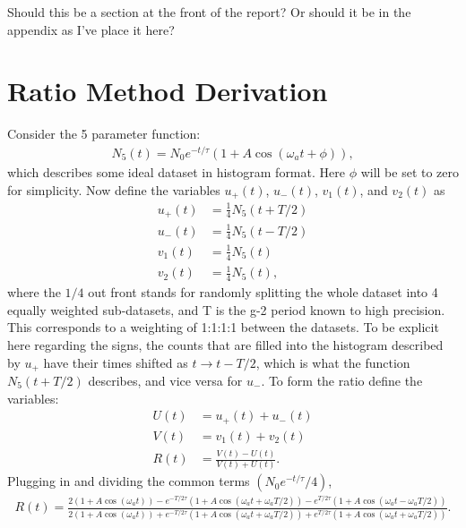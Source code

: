 Should this be a section at the front of the report? Or should it be in the appendix as I've place it here?

\chapter{Ratio Method Derivation}

Consider the 5 parameter function:
	\begin{align}
		N_{5}(t) = N_{0}e^{-t/\tau}(1 + A \cos(\omega_{a}t + \phi)),
	\end{align}
which describes some ideal dataset in histogram format. Here $\phi$ will be set to zero for simplicity. Now define the variables $u_{+}(t)$, $u_{-}(t)$, $v_{1}(t)$, and $v_{2}(t)$ as
	\begin{equation}
	\begin{aligned}
		u_{+}(t) &= \frac{1}{4} N_{5}(t+T/2) \\
		u_{-}(t) &= \frac{1}{4} N_{5}(t-T/2) \\
		v_{1}(t) &= \frac{1}{4} N_{5}(t) \\
		v_{2}(t) &= \frac{1}{4} N_{5}(t),
	\end{aligned}
	\end{equation}
where the $1/4$ out front stands for randomly splitting the whole dataset into 4 equally weighted sub-datasets, and T is the g-2 period known to high precision. This corresponds to a weighting of 1:1:1:1 between the datasets. To be explicit here regarding the signs, the counts that are filled into the histogram described by $u_{+}$ have their times shifted as $t \rightarrow t - T/2$, which is what the function $N_{5}(t+T/2)$ describes, and vice versa for $u_{-}$. To form the ratio define the variables:
	\begin{equation}
	\begin{aligned}
		U(t) &= u_{+}(t) + u_{-}(t) \\
		V(t) &= v_{1}(t) + v_{2}(t) \\
		R(t) &= \frac{V(t) - U(t)}{V(t) + U(t)}.
	\end{aligned}
	\end{equation}
Plugging in and dividing the common terms $(N_{0}e^{-t/\tau}/4)$,
	\begin{align}
		R(t) = \frac{2(1 + A \cos(\omega_{a}t)) - e^{-T/ 2\tau} (1 + A \cos(\omega_{a}t + \omega_{a}T/2)) - e^{T/ 2\tau} (1 + A \cos(\omega_{a}t - \omega_{a}T/2))} {2(1 + A \cos(\omega_{a}t)) + e^{-T/ 2\tau} (1 + A \cos(\omega_{a}t + \omega_{a}T/2)) + e^{T/ 2\tau} (1 + A \cos(\omega_{a}t + \omega_{a}T/2))}.
	\end{align}
